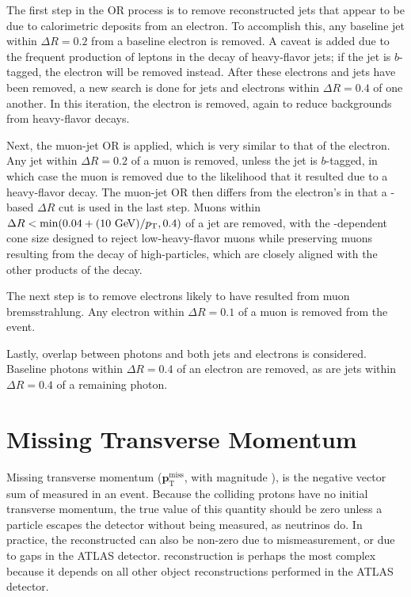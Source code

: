 The first step in the \ac{OR} process is to remove reconstructed jets that appear to be due to calorimetric deposits from an electron. To accomplish this, any baseline jet within $\Delta R = 0.2$ from a baseline electron is removed. A caveat is added due to the frequent production of leptons in the decay of heavy-flavor jets; if the jet is $b$-tagged, the electron will be removed instead. After these electrons and jets have been removed, a new search is done for jets and electrons within $\Delta R = 0.4$ of one another. In this iteration, the electron is removed, again to reduce backgrounds from heavy-flavor decays.

Next, the muon-jet \ac{OR} is applied, which is very similar to that of the electron. Any jet within $\Delta R = 0.2$ of a muon is removed, unless the jet is $b$-tagged, in which case the muon is removed due to the likelihood that it resulted due to a heavy-flavor decay. The muon-jet \ac{OR} then differs from the electron's in that a \pt-based $\Delta R$ cut is used in the last step. Muons within $\Delta R < \mathrm{min}(0.04 + (10 \gev)/\pt, 0.4)$ of a jet are removed, with the \pt-dependent cone size designed to reject low-\pt heavy-flavor muons while preserving muons resulting from the decay of high-\pt particles, which are closely aligned with the other products of the decay. 

The next step is to remove electrons likely to have resulted from muon bremsstrahlung. Any electron within $\Delta R = 0.1$ of a muon is removed from the event. 

Lastly, overlap between photons and both jets and electrons is considered. Baseline photons within $\Delta R = 0.4$ of an electron are removed, as are jets within $\Delta R = 0.4$ of a remaining photon.

\section{Missing Transverse Momentum}
\label{sec:reco_met}

Missing transverse momentum (${\boldsymbol p}_{\mathrm{T}}^\mathrm{miss}$, with magnitude \met), is the negative vector sum of \pt measured in an event. Because the colliding protons have no initial transverse momentum, the true value of this quantity should be zero unless a particle escapes the detector without being measured, as neutrinos do. In practice, the reconstructed \met can also be non-zero due to mismeasurement, or due to gaps in the \ac{ATLAS} detector. \met reconstruction is perhaps the most complex because it depends on all other object reconstructions performed in the \ac{ATLAS} detector. 

